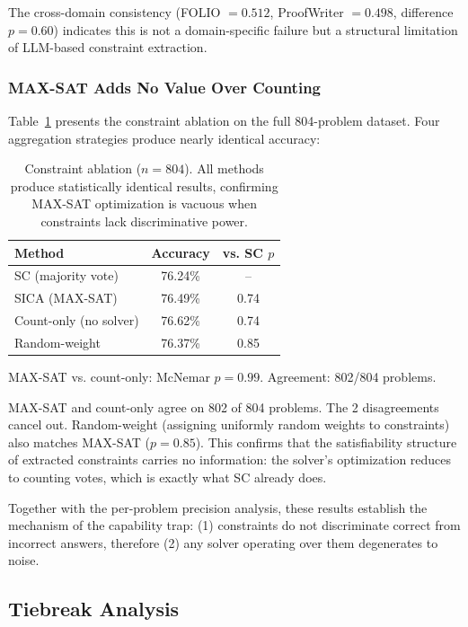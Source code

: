 \documentclass[11pt,a4paper]{article}
\begin{document}
The cross-domain consistency (FOLIO $= 0.512$, ProofWriter $= 0.498$, difference $p{=}0.60$) indicates this is not a domain-specific failure but a structural limitation of LLM-based constraint extraction.

\subsubsection{MAX-SAT Adds No Value Over Counting}

Table~\ref{tab:ablation} presents the constraint ablation on the full 804-problem dataset. Four aggregation strategies produce nearly identical accuracy:

\begin{table}[t]
\centering
\small
\caption{Constraint ablation ($n{=}804$). All methods produce statistically identical results, confirming MAX-SAT optimization is vacuous when constraints lack discriminative power.}
\label{tab:ablation}
\begin{tabular}{lcc}
\toprule
\textbf{Method} & \textbf{Accuracy} & \textbf{vs. SC $p$} \\
\midrule
SC (majority vote) & 76.24\% & -- \\
SICA (MAX-SAT) & 76.49\% & 0.74 \\
Count-only (no solver) & 76.62\% & 0.74 \\
Random-weight & 76.37\% & 0.85 \\
\bottomrule
\end{tabular}
\vspace{0.3em}
\footnotesize{MAX-SAT vs. count-only: McNemar $p = 0.99$. Agreement: 802/804 problems.}
\end{table}

MAX-SAT and count-only agree on 802 of 804 problems. The 2 disagreements cancel out. Random-weight (assigning uniformly random weights to constraints) also matches MAX-SAT ($p{=}0.85$). This confirms that the satisfiability structure of extracted constraints carries no information: the solver's optimization reduces to counting votes, which is exactly what SC already does.

Together with the per-problem precision analysis, these results establish the mechanism of the capability trap: (1) constraints do not discriminate correct from incorrect answers, therefore (2) any solver operating over them degenerates to noise.

\subsection{Tiebreak Analysis}
\label{sec:tiebreak}
\end{document}
